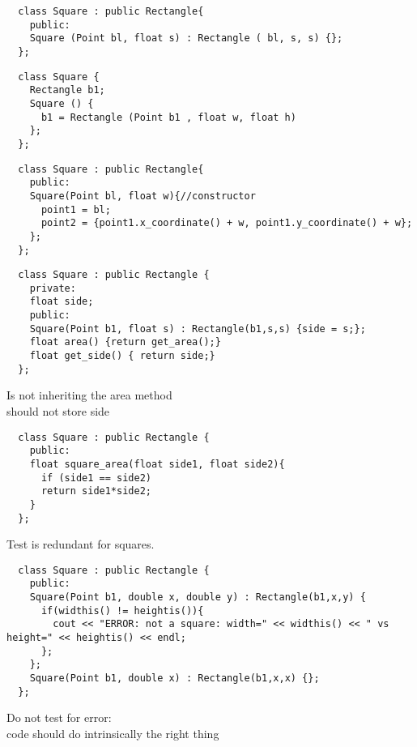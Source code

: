 

\begin{lstlisting}
  class Square : public Rectangle{
    public:
    Square (Point bl, float s) : Rectangle ( bl, s, s) {};
  };
\end{lstlisting}


\begin{lstlisting}
  class Square {
    Rectangle b1;
    Square () {
      b1 = Rectangle (Point b1 , float w, float h)
    };
  };
\end{lstlisting}


\begin{lstlisting}
  class Square : public Rectangle{
    public:
    Square(Point bl, float w){//constructor
      point1 = bl;
      point2 = {point1.x_coordinate() + w, point1.y_coordinate() + w};
    };
  };
\end{lstlisting}


\begin{lstlisting}
  class Square : public Rectangle {
    private:
    float side;
    public:
    Square(Point b1, float s) : Rectangle(b1,s,s) {side = s;};
    float area() {return get_area();}
    float get_side() { return side;}
  };
\end{lstlisting}

Is not inheriting the area method\\
should not store side


\begin{lstlisting}
  class Square : public Rectangle {
    public:
    float square_area(float side1, float side2){
      if (side1 == side2)
      return side1*side2;
    }
  };
\end{lstlisting}

Test is redundant for squares.


\begin{lstlisting}
  class Square : public Rectangle {
    public:
    Square(Point b1, double x, double y) : Rectangle(b1,x,y) {
      if(widthis() != heightis()){
        cout << "ERROR: not a square: width=" << widthis() << " vs height=" << heightis() << endl;
      };
    };
    Square(Point b1, double x) : Rectangle(b1,x,x) {};
  };
\end{lstlisting}

Do not test for error:\\
code should do intrinsically the right thing

